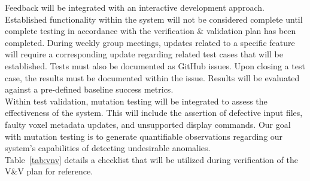 \documentclass[12pt, titlepage]{article}
\begin{document}
\noindent Feedback will be integrated with an interactive development approach. Established functionality within the system will not be considered complete until complete testing in accordance with the verification \& validation plan has been completed. During weekly group meetings, updates related to a specific feature will require a corresponding update regarding related test cases that will be established. Tests must also be documented as GitHub issues. Upon closing a test case, the results must be documented within the issue. Results will be evaluated against a pre-defined baseline success metrics. \\

\noindent Within test validation, mutation testing will be integrated to assess the effectiveness of the system. This will include the assertion of defective input files, faulty voxel metadata updates, and unsupported display commands. Our goal with mutation testing is to generate quantifiable observations regarding our system’s capabilities of detecting undesirable anomalies.\\

\noindent Table~\ref{tab:vnv} details a checklist that will be utilized during verification of the V\&V plan for reference.\\
\end{document}
